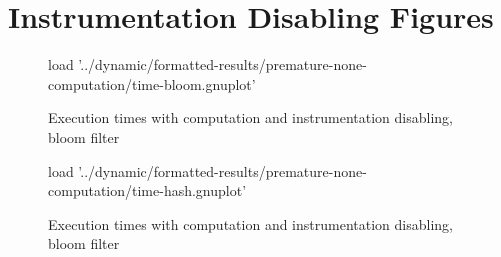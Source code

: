 \chapter{Instrumentation Disabling Figures} \label{chp:append:disabe}

\begin{figure}
	\centering
	\begin{gnuplot}[terminal=pdf]
	load '../dynamic/formatted-results/premature-none-computation/time-bloom.gnuplot'
	\end{gnuplot}
	\caption{Execution times with computation and instrumentation disabling, bloom filter}
	\label{chart:premature-none-bloom}
\end{figure}

\begin{figure}
	\centering
	\begin{gnuplot}[terminal=pdf]
		load '../dynamic/formatted-results/premature-none-computation/time-hash.gnuplot'

	\end{gnuplot}
	\caption{Execution times with computation and instrumentation disabling, bloom filter}
	\label{chart:premature-none-hash}
\end{figure}